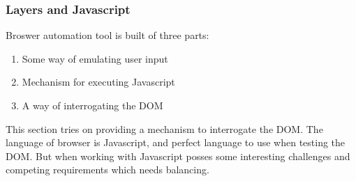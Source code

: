 \documentclass[article,type=msc,colorback,accentcolor=tud9c,twoside,11pt]{tudthesis}
\begin{document}
\subsubsection{Layers and Javascript}
Broswer automation tool is built of three parts:
\begin{enumerate}
	\item Some way of emulating user input
	\item Mechanism for executing Javascript
	\item A way of interrogating the DOM
\end{enumerate}
This section tries on providing a mechanism to interrogate the DOM. The language of browser is Javascript, and perfect language to use when testing the DOM. But when working with Javascript posses some interesting challenges and competing requirements which needs balancing.
\end{document}

